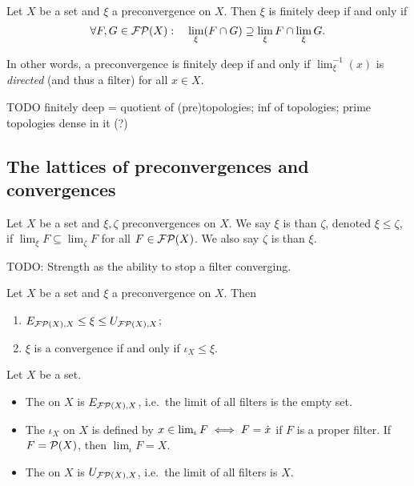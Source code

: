 \begin{lemma}
Let $X$ be a set and $\xi$ a preconvergence on $X$. Then $\xi$ is finitely deep \textup{if and only if}
\[ \forall F,G \in \operatorname{\mathcal{FP}}(X): \quad \lim_\xi(F\cap G) \supseteq \lim_\xi F \cap \lim_\xi G. \]
\end{lemma}
In other words, a preconvergence is finitely deep \textup{if and only if} $\lim_\xi^{-1}(x)$ is \emph{directed} (and thus a filter) for all $x\in X$.

TODO finitely deep = quotient of (pre)topologies; inf of topologies; prime topologies dense in it (?)

\subsection{The lattices of preconvergences and convergences}
\begin{definition}
Let $X$ be a set and $\xi,\zeta$ preconvergences on $X$. We say $\xi$ is  than $\zeta$, denoted $\xi \leq \zeta$, if $\lim_\xi F \subseteq \lim_\zeta F$ for all $F\in\operatorname{\mathcal{FP}}(X)$. We also say $\zeta$ is  than $\xi$.
\end{definition}

TODO: Strength as the ability to stop a filter converging.

\begin{lemma}
Let $X$ be a set and $\xi$ a preconvergence on $X$. Then
\begin{enumerate}
\item $E_{\operatorname{\mathcal{FP}}(X), X} \leq \xi \leq U_{\operatorname{\mathcal{FP}}(X), X}$;
\item $\xi$ is a convergence \textup{if and only if} $\iota_X \leq \xi$.
\end{enumerate}
\end{lemma}

\begin{definition}
Let $X$ be a set.
\begin{itemize}
\item The  on $X$ is $E_{\operatorname{\mathcal{FP}}(X), X}$, i.e.\ the limit of all filters is the empty set.
\item The  $\iota_X$ on $X$ is defined by $x \in \lim_\iota F \iff F = \dot{x}$ if $F$ is a proper filter. If $F = \operatorname{\mathcal{P}}(X)$, then $\lim_\iota F = X$.
\item The  on $X$ is $U_{\operatorname{\mathcal{FP}}(X), X}$, i.e.\ the limit of all filters is $X$.
\end{itemize}
\end{definition}

